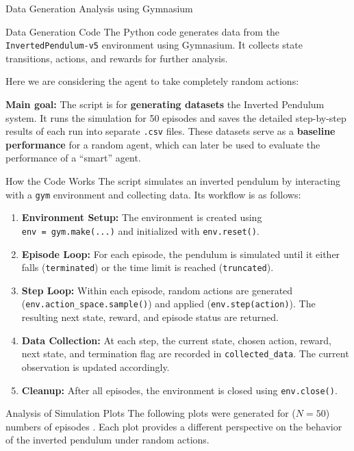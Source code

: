\begin{frame}[fragile]{Data Generation Analysis using Gymnasium}
\begin{block}{Data Generation Code}
\protect{}\label{data-generation-code}
The Python code generates data from the \texttt{InvertedPendulum-v5}
environment using Gymnasium. It collects state transitions, actions, and
rewards for further analysis.

Here we are considering the agent to take completely random actions:

\textbf{Main goal:} The script is for \textbf{generating datasets} the
Inverted Pendulum system. It runs the simulation for 50 episodes and
saves the detailed step-by-step results of each run into separate
\texttt{.csv} files. These datasets serve as a \textbf{baseline
performance} for a random agent, which can later be used to evaluate the
performance of a ``smart'' agent.

\begin{block}{How the Code Works}
\protect{}\label{how-the-code-works}
The script simulates an inverted pendulum by interacting with a
\texttt{gym} environment and collecting data. Its workflow is as
follows:

\begin{enumerate}
\item
  \textbf{Environment Setup:} The environment is created using
  \texttt{env\ =\ gym.make(...)} and initialized with
  \texttt{env.reset()}.
\item
  \textbf{Episode Loop:} For each episode, the pendulum is simulated
  until it either falls (\texttt{terminated}) or the time limit is
  reached (\texttt{truncated}).
\item
  \textbf{Step Loop:} Within each episode, random actions are generated
  (\texttt{env.action\_space.sample()}) and applied
  (\texttt{env.step(action)}). The resulting next state, reward, and
  episode status are returned.
\item
  \textbf{Data Collection:} At each step, the current state, chosen
  action, reward, next state, and termination flag are recorded in
  \texttt{collected\_data}. The current observation is updated
  accordingly.
\item
  \textbf{Cleanup:} After all episodes, the environment is closed using
  \texttt{env.close()}.
\end{enumerate}
\end{block}
\end{block}

\begin{block}{Analysis of Simulation Plots}
\protect{}\label{analysis-of-simulation-plots}
The following plots were generated for (\(N = 50\)) numbers of episodes
. Each plot provides a different perspective on the behavior of the
inverted pendulum under random actions.


\end{block}
\end{frame}
